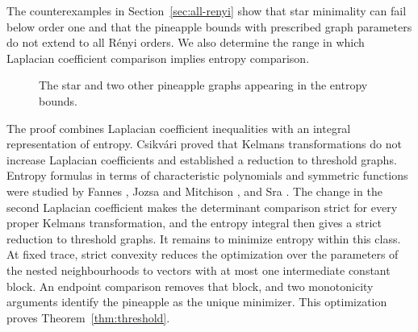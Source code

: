 \documentclass[11pt,a4paper,reqno]{amsart}
\theoremstyle{remark}
\numberwithin{equation}{section}
\begin{document}
The counterexamples in Section~\ref{sec:all-renyi} show that star
minimality can fail below order one and that the pineapple bounds
with prescribed graph parameters do not extend to all R\'enyi orders.
We also determine the
range in which Laplacian coefficient comparison implies entropy
comparison.

\begin{figure}[t]
\centering
{}
\caption{The star and two other pineapple graphs appearing in the entropy bounds.}
\label{fig:extremal-graphs}
\end{figure}



The proof combines Laplacian coefficient inequalities with an
integral representation of entropy. Csikv\'ari \cite{Csikvari2011}
proved that Kelmans transformations do not increase Laplacian
coefficients and established a reduction to threshold graphs.
Entropy formulas in terms of characteristic polynomials and symmetric
functions were studied by Fannes \cite{Fannes2014}, Jozsa and Mitchison
\cite{JozsaMitchison2015}, and Sra \cite{Sra2019}.
The change in the second Laplacian coefficient makes the determinant
comparison strict for every proper Kelmans transformation, and the
entropy integral then gives a strict reduction to threshold graphs.
It remains to minimize entropy within this class. At fixed trace,
strict convexity reduces the optimization over the parameters of the
nested neighbourhoods to vectors with at most one intermediate
constant block. An endpoint comparison removes that block, and two
monotonicity arguments identify the pineapple as the unique minimizer.
This optimization proves Theorem~\ref{thm:threshold}.
\end{document}
